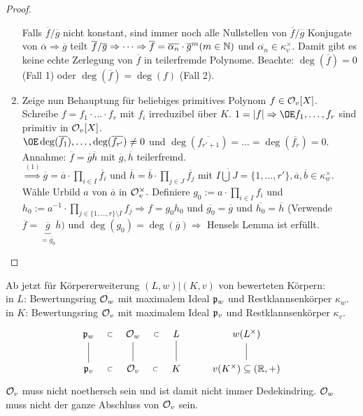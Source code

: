 \begin{proof}
\begin{enumerate}[(1)]
Falls $\overline{f}/\overline{g}$ nicht konstant, sind immer noch alle Nullstellen von $\overline{f}/\overline{g}$ Konjugate von $\overline{\alpha} \Rightarrow \overline{g}$ teilt $\overline{f}/\overline{g} \Rightarrow \dots \Rightarrow \overline{f}=\overline{\alpha_n} \cdot \overline{g}^m (m \in \mathbb{N})$ und $\overline{\alpha_n} \in \kappa^\times_v$. Damit gibt es keine echte Zerlegung von $\overline{f}$ in teilerfremde Polynome. Beachte: $\deg(\overline{f})=0$ (Fall 1) oder $\deg(\overline{f})=\deg(f)$ (Fall 2).
\item Zeige nun Behauptung für beliebiges primitives Polynom $f \in \mathcal{O}_v[X]$.\\
Schreibe $f=f_1 \cdot \ldots \cdot f_r$ mit $f_i$ irreduzibel über $K$. $1=|f| \Rightarrow \OE f_1, \dots, f_r$ sind primitiv in $\mathcal{O}_v[X]$.\\
$\OE \deg(\overline{f_1}), \dots, \deg(\overline{f_{r'}}) \neq 0$ und $\deg(\overline{f_{r'+1}})=\dots=\deg(\overline{f_r})=0.$\\
Annahme: $\overline{f}=\overline{g}\overline{h}$ mit $\overline{g}, \overline{h}$ teilerfremd.\\
$\stackrel{(1)}{\Rightarrow} \overline{g}=\overline{a} \cdot \prod_{i \in I} \overline{f_i}$ und $ \overline{h}=\overline{b} \cdot \prod_{j \in J} \overline{f_j}$ mit $I \dot{\bigcup} J = \{1, \dots, r'\}, \overline{a}, \overline{b} \in \kappa_w^\times$.\\
Wähle Urbild $a$ von $\overline{a}$ in $\mathcal{O}_v^\times.$ Definiere $g_0:=a \cdot \prod_{i \in I} f_i$ und $h_0:= a^{-1}\cdot \prod_{j \in \{1, \dots, r\} \setminus I} f_j \Rightarrow f= g_0h_0$ und $\overline{g_0}=\overline{g}$ und $\overline{h_0}=\overline{h}$ (Verwende $\overline{f}=\underbrace{\overline{g}}_{=\overline{g_0}} \overline{h})$ und $\deg(g_0)=\deg(\overline{g}) \Rightarrow$ Hensels Lemma ist erfüllt.
\end{enumerate}
\end{proof}

\begin{Not}
Ab jetzt für Körpererweiterung $(L,w)|(K,v)$ von bewerteten Körpern:\\
in $L$: Bewertungsring $\mathcal{O}_w$ mit maximalem Ideal $\mathfrak{p}_w$ und Restklannsenkörper $\kappa_w$.\\
in $K$: Bewertungsring $\mathcal{O}_v$ mit maximalem Ideal $\mathfrak{p}_v$ und Restklannsenkörper $\kappa_v$.
\[\begin{tikzcd}
\p_w  \arrow[draw=none]{r}[auto=false, sloped]{\subset} & \O_w \arrow[draw=none]{r}[auto=false, sloped]{\subset} & L &w(L^\times)\\
\p_v  \arrow[dash]{u} \arrow[draw=none]{r}[auto=false, sloped]{\subset} & \O_v \arrow[dash]{u} \arrow[draw=none]{r}[auto=false, sloped]{\subset} & K \arrow[dash]{u} & v(K^\times) \subseteq (\R,+) \arrow[dash]{u} 
\end{tikzcd}\]
\danger $\mathcal{O}_v$ muss nicht noethersch sein und ist damit nicht immer Dedekindring. $\mathcal{O}_w$ muss nicht der ganze Abschluss von $\mathcal{O}_v$ sein.
\end{Not}

